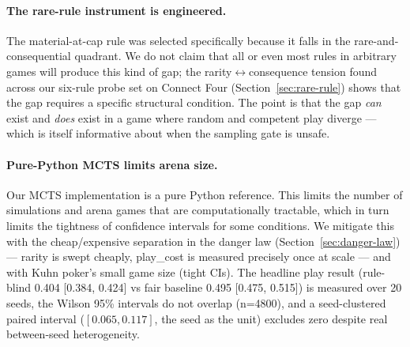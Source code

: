 \documentclass[11pt]{article}
\theoremstyle{remark}
\begin{document}
\paragraph{The rare-rule instrument is engineered.} The material-at-cap rule was selected specifically because it falls in the rare-and-consequential quadrant. We do not claim that all or even most rules in arbitrary games will produce this kind of gap; the rarity$\leftrightarrow$consequence tension found across our six-rule probe set on Connect Four (Section~\ref{sec:rare-rule}) shows that the gap requires a specific structural condition. The point is that the gap \emph{can} exist and \emph{does} exist in a game where random and competent play diverge --- which is itself informative about when the sampling gate is unsafe.

\paragraph{Pure-Python MCTS limits arena size.} Our MCTS implementation is a pure Python reference. This limits the number of simulations and arena games that are computationally tractable, which in turn limits the tightness of confidence intervals for some conditions. We mitigate this with the cheap/expensive separation in the danger law (Section~\ref{sec:danger-law}) --- rarity is swept cheaply, play\_cost is measured precisely once at scale --- and with Kuhn poker's small game size (tight CIs). The headline play result (rule-blind 0.404 [0.384, 0.424] vs fair baseline 0.495 [0.475, 0.515]) is measured over 20 seeds, the Wilson 95\% intervals do not overlap (n=4800), and a seed-clustered paired interval ($[0.065, 0.117]$, the seed as the unit) excludes zero despite real between-seed heterogeneity.
\end{document}

